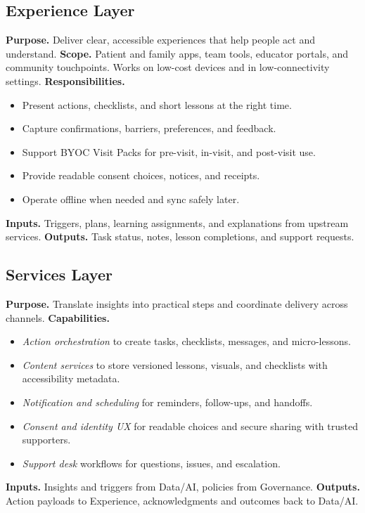 \documentclass[12pt]{article}
\begin{document}
\subsection*{Experience Layer}
\textbf{Purpose.} Deliver clear, accessible experiences that help people act and understand.  
\textbf{Scope.} Patient and family apps, team tools, educator portals, and community touchpoints. Works on low-cost devices and in low-connectivity settings.  
\textbf{Responsibilities.}
\begin{itemize}[leftmargin=*]
  \item Present actions, checklists, and short lessons at the right time.
  \item Capture confirmations, barriers, preferences, and feedback.
  \item Support BYOC Visit Packs for pre-visit, in-visit, and post-visit use.
  \item Provide readable consent choices, notices, and receipts.
  \item Operate offline when needed and sync safely later.
\end{itemize}
\textbf{Inputs.} Triggers, plans, learning assignments, and explanations from upstream services.  
\textbf{Outputs.} Task status, notes, lesson completions, and support requests.

\subsection*{Services Layer}
\textbf{Purpose.} Translate insights into practical steps and coordinate delivery across channels.  
\textbf{Capabilities.}
\begin{itemize}[leftmargin=*]
  \item \textit{Action orchestration} to create tasks, checklists, messages, and micro-lessons.
  \item \textit{Content services} to store versioned lessons, visuals, and checklists with accessibility metadata.
  \item \textit{Notification and scheduling} for reminders, follow-ups, and handoffs.
  \item \textit{Consent and identity UX} for readable choices and secure sharing with trusted supporters.
  \item \textit{Support desk} workflows for questions, issues, and escalation.
\end{itemize}
\textbf{Inputs.} Insights and triggers from Data/AI, policies from Governance.  
\textbf{Outputs.} Action payloads to Experience, acknowledgments and outcomes back to Data/AI.
\end{document}
